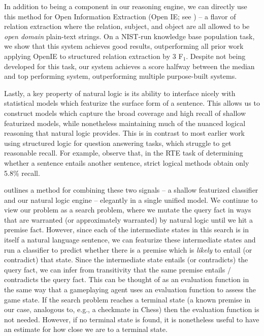 In addition to being a component in our reasoning engine,
  we can directly use this method for Open Information Extraction 
  (Open IE; see ) -- a flavor of relation 
  extraction where the relation, subject, and 
  object are all allowed to be \textit{open domain} plain-text strings.
On a NIST-run knowledge base population task, we show that this system 
  achieves good results, outperforming all prior work applying OpenIE
  to structured relation extraction by 3 F$_1$.
Despite not being developed for this 
  task, our system achieves a score halfway between the median and top 
  performing system, outperforming multiple purpose-built systems.


%
%
Lastly, a key property of natural logic is its ability to interface nicely with 
  statistical models which featurize the surface form of a sentence.
This allows us to construct models which capture the broad coverage and high recall
  of shallow featurized models, while nonetheless maintaining much of the nuanced logical
  reasoning that natural logic provides.
This is in contrast to most earlier work using structured logic for question answering
  tasks, which struggle to get reasonable recall.
For example,  observe that, in the RTE task of determining whether a
  sentence entails another sentence, strict logical methods obtain only 5.8\% recall.


 outlines a method for combining these two signals -- a shallow
  featurized classifier and our natural logic engine -- elegantly in
  a single unified model.
We continue to view our problem as a search problem, where we mutate the query fact
  in ways that are warranted (or approximately warranted) by natural logic until we
  hit a premise fact.
However, since each of the intermediate states in this search is in itself a natural
  language sentence, we can featurize these intermediate states and run a classifier
  to predict whether there is a premise which is \textit{likely} to entail (or contradict) that state.
Since the intermediate state entails (or contradicts) the query fact, we can infer
  from transitivity that the same premise entails / contradicts the query fact.
This can be thought of as an evaluation function in the same way that a gameplaying agent
  uses an evaluation function to assess the game state.
If the search problem reaches a terminal state (a known premise in our case, analogous to, e.g., a checkmate
  in Chess) then the evaluation function is not needed.
However, if no terminal state is found, it is nonetheless useful to have an estimate for how close we
  are to a terminal state.

